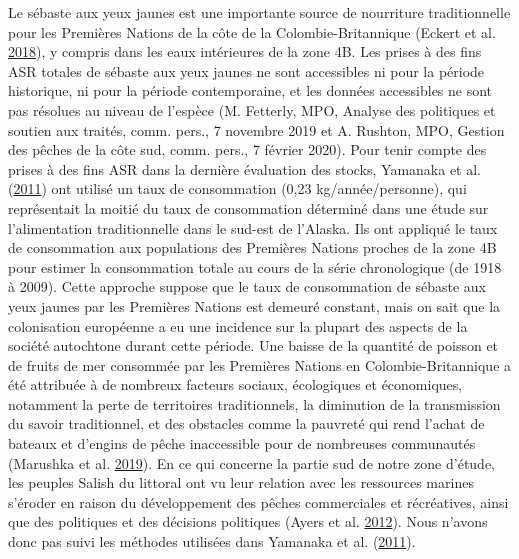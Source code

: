 \documentclass[french,11pt]{book}
\begin{document}
Le sébaste aux yeux jaunes est une importante source de nourriture traditionnelle pour les Premières Nations de la côte de la Colombie-Britannique (Eckert et al. \protect\hyperlink{ref-eckert2018}{2018}), y compris dans les eaux intérieures de la zone 4B. Les prises à des fins ASR totales de sébaste aux yeux jaunes ne sont accessibles ni pour la période historique, ni pour la période contemporaine, et les données accessibles ne sont pas résolues au niveau de l'espèce (M. Fetterly, MPO, Analyse des politiques et soutien aux traités, comm. pers., 7 novembre 2019 et A. Rushton, MPO, Gestion des pêches de la côte sud, comm. pers., 7 février 2020). Pour tenir compte des prises à des fins ASR dans la dernière évaluation des stocks, Yamanaka et al. (\protect\hyperlink{ref-yamanaka2011}{2011}) ont utilisé un taux de consommation (0,23 kg/année/personne), qui représentait la moitié du taux de consommation déterminé dans une étude sur l'alimentation traditionnelle dans le sud-est de l'Alaska. Ils ont appliqué le taux de consommation aux populations des Premières Nations proches de la zone 4B pour estimer la consommation totale au cours de la série chronologique (de 1918 à 2009). Cette approche suppose que le taux de consommation de sébaste aux yeux jaunes par les Premières Nations est demeuré constant, mais on sait que la colonisation européenne a eu une incidence sur la plupart des aspects de la société autochtone durant cette période. Une baisse de la quantité de poisson et de fruits de mer consommée par les Premières Nations en Colombie-Britannique a été attribuée à de nombreux facteurs sociaux, écologiques et économiques, notamment la perte de territoires traditionnels, la diminution de la transmission du savoir traditionnel, et des obstacles comme la pauvreté qui rend l'achat de bateaux et d'engins de pêche inaccessible pour de nombreuses communautés (Marushka et al. \protect\hyperlink{ref-marushka2019}{2019}). En ce qui concerne la partie sud de notre zone d'étude, les peuples Salish du littoral ont vu leur relation avec les ressources marines s'éroder en raison du développement des pêches commerciales et récréatives, ainsi que des politiques et des décisions politiques (Ayers et al. \protect\hyperlink{ref-ayers2012}{2012}). Nous n'avons donc pas suivi les méthodes utilisées dans Yamanaka et al. (\protect\hyperlink{ref-yamanaka2011}{2011}).
\end{document}

